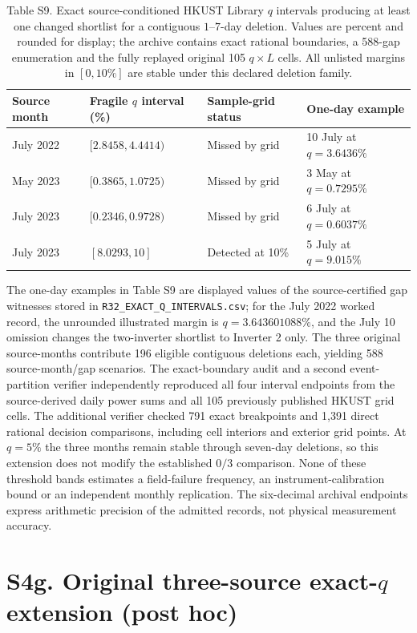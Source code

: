\documentclass[11pt]{article}
\begin{document}
\begin{table}[ht]
\centering
\caption*{Table S9. Exact source-conditioned HKUST Library $q$ intervals producing at least one changed shortlist for a contiguous $1$--$7$-day deletion. Values are percent and rounded for display; the archive contains exact rational boundaries, a 588-gap enumeration and the fully replayed original 105 $q\times L$ cells. All unlisted margins in $[0,10\%]$ are stable under this declared deletion family.}
\small
\begin{tabular}{p{1.9cm}p{3.1cm}p{2.3cm}p{3.6cm}}
\toprule
Source month & Fragile $q$ interval (\%) & Sample-grid status & One-day example \\
\midrule
July 2022 & $[2.8458,4.4414)$ & Missed by grid & 10 July at $q=3.6436\%$ \\
May 2023 & $[0.3865,1.0725)$ & Missed by grid & 3 May at $q=0.7295\%$ \\
July 2023 & $[0.2346,0.9728)$ & Missed by grid & 6 July at $q=0.6037\%$ \\
July 2023 & $[8.0293,10]$ & Detected at 10\% & 5 July at $q=9.015\%$ \\
\bottomrule
\end{tabular}
\end{table}

The one-day examples in Table S9 are displayed values of the source-certified gap witnesses stored in \texttt{R32\_EXACT\_Q\_INTERVALS.csv}; for the July 2022 worked record, the unrounded illustrated margin is $q=3.643601088\%$, and the July 10 omission changes the two-inverter shortlist to Inverter 2 only. The three original source-months contribute 196 eligible contiguous deletions each, yielding 588 source-month/gap scenarios. The exact-boundary audit and a second event-partition verifier independently reproduced all four interval endpoints from the source-derived daily power sums and all 105 previously published HKUST grid cells. The additional verifier checked 791 exact breakpoints and 1,391 direct rational decision comparisons, including cell interiors and exterior grid points. At $q=5\%$ the three months remain stable through seven-day deletions, so this extension does not modify the established $0/3$ comparison. None of these threshold bands estimates a field-failure frequency, an instrument-calibration bound or an independent monthly replication. The six-decimal archival endpoints express arithmetic precision of the admitted records, not physical measurement accuracy.


\section*{S4g. Original three-source exact-$q$ extension (post hoc)}
\end{document}
